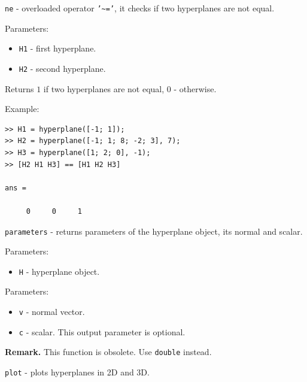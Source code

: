 \documentclass{report}
\begin{document}
\newpage

{\Large {\tt ne}} - overloaded operator {\tt '\~{ }='},
it checks if two hyperplanes are not equal.

Parameters:
\begin{itemize}
\item {\tt H1} - first hyperplane.
\item {\tt H2} - second hyperplane.
\end{itemize}

Returns $1$ if two hyperplanes are not equal, $0$ - otherwise.

Example:
{\tt \begin{verbatim}
>> H1 = hyperplane([-1; 1]);
>> H2 = hyperplane([-1; 1; 8; -2; 3], 7);
>> H3 = hyperplane([1; 2; 0], -1);
>> [H2 H1 H3] == [H1 H2 H3]

ans =

     0     0     1
\end{verbatim} }

\newpage

{\Large {\tt parameters}} - returns parameters of the hyperplane object,
its normal and scalar.

Parameters:
\begin{itemize}
\item {\tt H} - hyperplane object.
\end{itemize}

Parameters:
\begin{itemize}
\item {\tt v} - normal vector.
\item {\tt c} - scalar. This output parameter is optional.
\end{itemize}

{\bf Remark.} This function is obsolete. Use {\tt double} instead.

\newpage

{\Large {\tt plot}} - plots hyperplanes in 2D and 3D.
\end{document}
